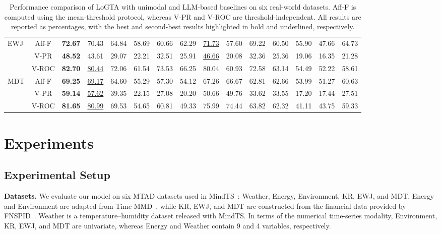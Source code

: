 \documentclass[letterpaper]{article} %
\newcommand{\method}{LoGTA}
\begin{document}
\begin{table}[!t]
{\begin{tabular}{l|c|c|c|c|c|c|c|c|c|c|c|c|c|c}
\midrule
\multirow{3}{*}{EWJ} & Aff-F & \textbf{72.67} & 70.43 & 64.84 & 58.69 & 60.66 & 62.29 & \underline{71.73} & 57.60 & 69.22 & 60.50 & 55.90 & 47.66 & 64.73 \\
& V-PR & \textbf{48.52} & 43.61 & 29.07 & 22.21 & 32.51 & 25.91 & \underline{46.66} & 20.08 & 32.36 & 25.36 & 19.06 & 16.35 & 21.28 \\
& V-ROC & \textbf{82.70} & \underline{80.44} & 72.06 & 61.54 & 73.53 & 66.25 & 80.04 & 60.93 & 72.58 & 63.14 & 54.49 & 52.22 & 58.61 \\
\midrule
\multirow{3}{*}{MDT} & Aff-F & \textbf{69.25} & \underline{69.17} & 64.60 & 55.29 & 57.30 & 54.12 & 67.26 & 66.67 & 62.81 & 62.66 & 53.99 & 51.27 & 60.63 \\
& V-PR & \textbf{59.14} & \underline{57.62} & 39.35 & 22.15 & 27.08 & 20.20 & 50.66 & 49.76 & 33.62 & 33.55 & 17.20 & 17.44 & 27.51 \\
& V-ROC & \textbf{81.65} & \underline{80.99} & 69.53 & 54.65 & 60.81 & 49.33 & 75.99 & 74.44 & 63.82 & 62.32 & 41.11 & 43.75 & 59.33 \\
\bottomrule
\end{tabular}
}
\caption{Performance comparison of \method{} with unimodal and LLM-based baselines on six real-world datasets. Aff-F is computed using the mean-threshold protocol, whereas V-PR and V-ROC are threshold-independent. All results are reported as percentages, with the best and second-best results highlighted in bold and underlined, respectively.}
\label{tab:main_results}
\end{table}







\section{Experiments}



\subsection{Experimental Setup}

\noindent\textbf{Datasets.}
We evaluate our model on six MTAD datasets used in MindTS~\cite{hu2026towards}: Weather, Energy, Environment, KR, EWJ, and MDT. Energy and Environment are adapted from Time-MMD~\cite{liu2024time}, while KR, EWJ, and MDT are constructed from the financial data provided by FNSPID~\cite{dong2024fnspid}. Weather is a temperature--humidity dataset released with MindTS. In terms of the numerical time-series modality, Environment, KR, EWJ, and MDT are univariate, whereas Energy and Weather contain 9 and 4 variables, respectively.
\end{document}
